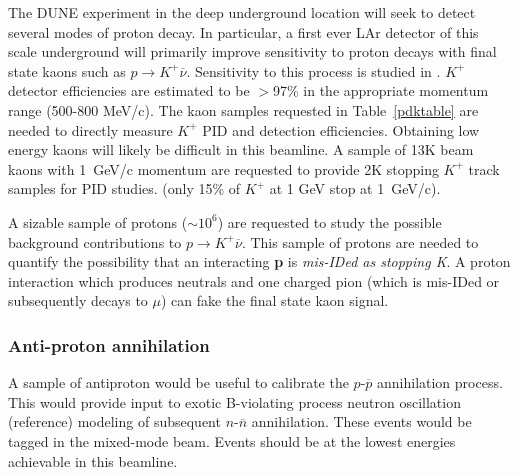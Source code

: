The DUNE experiment in the deep underground location will seek to detect several modes of proton decay.
In particular, a first ever LAr detector of this scale underground will primarily improve sensitivity to 
proton decays with final state kaons such as  $p \rightarrow K^+ \overline{\nu}$. 
Sensitivity to this process is studied in \cite{bueno}. $K^+$ detector efficiencies are estimated to be $>$97\% in the
appropriate momentum range (500-800 MeV/c). The kaon samples requested in Table~\ref{pdktable} are needed to directly measure 
$K^+$ PID and detection efficiencies. Obtaining low energy kaons will likely be difficult in this beamline.
A sample of 13K beam kaons with 1~GeV/c momentum are requested to provide 2K stopping $K^+$ track samples for PID studies.
(only 15\% of $K^+$ at 1 GeV stop at 1~GeV/c).



A sizable sample of protons ($\sim 10^6$)
are requested to study the possible background contributions to  $p \rightarrow K^+ \overline{\nu}$.
This sample of  protons are needed to quantify the possibility that an interacting {\bf p} 
is  {\em mis-IDed as stopping K}. A proton interaction which produces neutrals and one charged pion 
(which is mis-IDed or subsequently decays to $\mu$) can fake the final state kaon signal.


\subsubsection{Anti-proton annihilation }

A sample of antiproton would be useful to calibrate the $p$-$\overline{p}$ annihilation process. 
This would provide input to exotic B-violating process neutron oscillation (reference) modeling of 
subsequent  $n$-$\overline{n}$ annihilation. These events would be tagged in the mixed-mode beam.
Events should be at the lowest energies achievable in this beamline.



